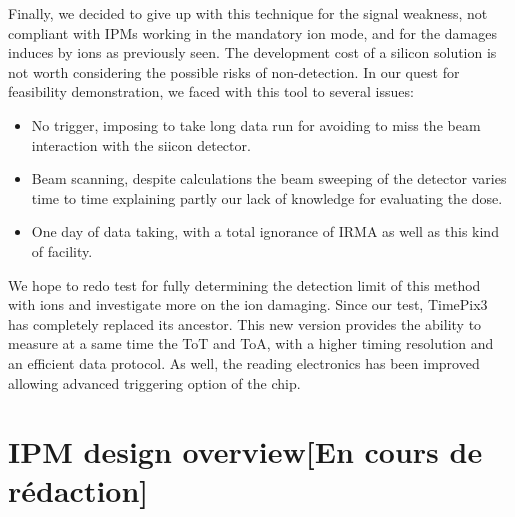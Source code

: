 \begin{refsection}
  Finally, we decided to give up with this technique for the signal weakness, not compliant with IPMs working in the mandatory  ion mode, and for the damages induces by ions as previously seen. The development cost of a silicon solution is not worth considering the possible risks of non-detection.
  In our quest for feasibility demonstration, we faced with this tool to several issues:
  \begin{itemize}
    \item No trigger, imposing to take long data run for avoiding to miss the beam interaction with the siicon detector.
    \item Beam scanning, despite calculations the beam sweeping of the detector varies time to time explaining partly our lack of knowledge for evaluating the dose.
    \item One day of data taking, with a total ignorance of IRMA as well as this kind of facility.
  \end{itemize}
 
  We hope to redo test for fully determining the detection limit of this method with ions and investigate more on the ion damaging. 
  Since our test, TimePix3 has completely replaced its ancestor. This new version provides the ability to measure at a same time the ToT and ToA, with a higher timing resolution and an efficient data protocol. As well, the reading electronics has been improved allowing advanced triggering option of the chip.



  \section{IPM design overview[En cours de rédaction]}

\end{refsection}
